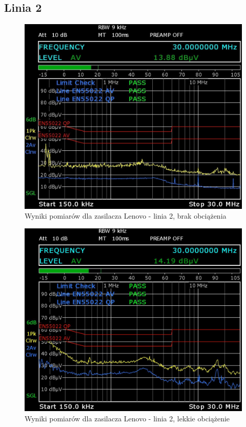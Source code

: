 \documentclass[12pt, a4paper, oneside]{article}
\begin{document}
\subsection{Linia 2}
\begin{figure}[h!]
\centering
\caption{Wyniki pomiarów dla zasilacza Lenovo - linia 2, brak obciążenia}
\includegraphics[scale=0.34]{Linia2/k1.png}
\end{figure}
\clearpage
\begin{figure}[t!]
\centering
\caption{Wyniki pomiarów dla zasilacza Lenovo - linia 2, lekkie obciążenie}
\includegraphics[scale=0.34]{Linia2/k2.png}
\end{figure}
\end{document}
